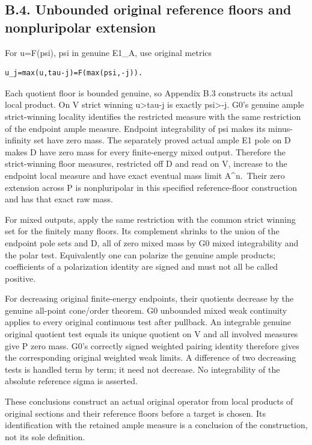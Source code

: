 \documentclass[
  10pt,
]{article}
\begin{document}
\subsection{B.4. Unbounded original reference floors and nonpluripolar
extension}\label{b.4.-unbounded-original-reference-floors-and-nonpluripolar-extension}

For u=F(psi), psi in genuine E1\_A, use original metrics

\begin{verbatim}
u_j=max(u,tau-j)=F(max(psi,-j)).
\end{verbatim}

Each quotient floor is bounded genuine, so Appendix B.3 constructs its
actual local product. On V strict winning u\textgreater tau-j is exactly
psi\textgreater-j. G0's genuine ample strict-winning locality identifies
the restricted measure with the same restriction of the endpoint ample
measure. Endpoint integrability of psi makes its minus-infinity set have
zero mass. The separately proved actual ample E1 pole on D makes D have
zero mass for every finite-energy mixed output. Therefore the
strict-winning floor measures, restricted off D and read on V, increase
to the endpoint local measure and have exact eventual mass limit
A\^{}n.~Their zero extension across P is nonpluripolar in this specified
reference-floor construction and has that exact raw mass.

For mixed outputs, apply the same restriction with the common strict
winning set for the finitely many floors. Its complement shrinks to the
union of the endpoint pole sets and D, all of zero mixed mass by G0
mixed integrability and the polar test. Equivalently one can polarize
the genuine ample products; coefficients of a polarization identity are
signed and must not all be called positive.

For decreasing original finite-energy endpoints, their quotients
decrease by the genuine all-point cone/order theorem. G0 unbounded mixed
weak continuity applies to every original continuous test after
pullback. An integrable genuine original quotient test equals its unique
quotient on V and all involved measures give P zero mass. G0's correctly
signed weighted pairing identity therefore gives the corresponding
original weighted weak limits. A difference of two decreasing tests is
handled term by term; it need not decrease. No integrability of the
absolute reference sigma is asserted.

These conclusions construct an actual original operator from local
products of original sections and their reference floors before a target
is chosen. Its identification with the retained ample measure is a
conclusion of the construction, not its sole definition.
\end{document}
